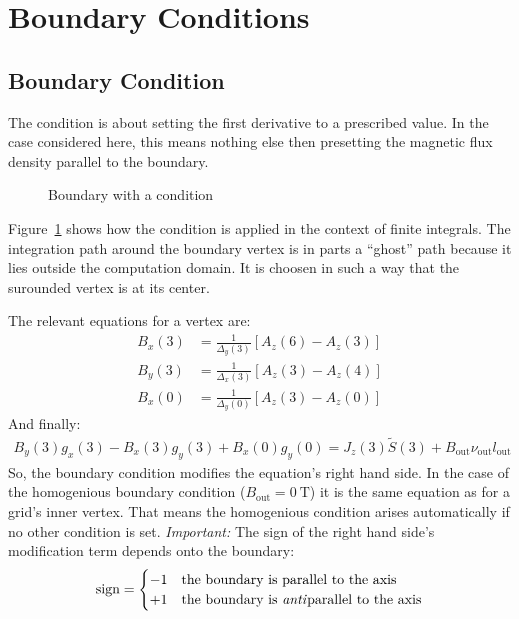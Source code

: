 \section{Boundary Conditions}
\label{sec:bound-treatm-cond}

\subsection{ Boundary Condition}
\label{sec:neumann}

The  condition is about setting the first
derivative to a prescribed value.  In the case considered here, this
means nothing else then presetting the magnetic flux density parallel
to the boundary.
\begin{figure}
  \centering
  \caption{Boundary with a  condition}
  \label{fig:neumann-boundary}
\end{figure}
Figure~\ref{fig:neumann-boundary} shows how the 
condition is applied in the context of finite integrals.  The
integration path around the boundary vertex is in parts a ``ghost'' path
because it lies outside the computation domain.  It is choosen in such
a way that the surounded vertex is at its center.  \par The relevant
equations for a  vertex are:
\begin{align*}
  B_x(3)&=\frac{1}{\Delta_y(3)}\left[A_z(6)-A_z(3)\right]  \\
  B_y(3)&=\frac{1}{\Delta_x(3)}\left[A_z(3)-A_z(4)\right]  \\
  B_x(0)&=\frac{1}{\Delta_y(0)}\left[A_z(3)-A_z(0)\right]
\end{align*}
And finally:
\begin{gather}
  \label{eq:19}
  B_y(3)g_x(3)-B_x(3)g_y(3)+B_x(0)g_y(0)
    =J_z(3)\tilde{S}(3)+B_{\text{out}}\nu_{\text{out}}l_{\text{out}}
\end{gather}
So, the  boundary condition modifies the
equation's right hand side.  In the case of the homogenious
 boundary condition
($B_{\text{out}}=\qty{0}{\tesla}$) it is the same equation as for a
grid's inner vertex.  That means the homogenious 
condition arises automatically if no other condition is set.
\emph{Important:}  The sign of the right hand side's modification term
depends onto the boundary:
\begin{gather*}
  \text{sign}=
  \begin{cases}
    -1 & \text{the boundary is parallel to the axis} \\
    +1 & \text{the boundary is \emph{anti}parallel to the axis}
  \end{cases}
\end{gather*}

